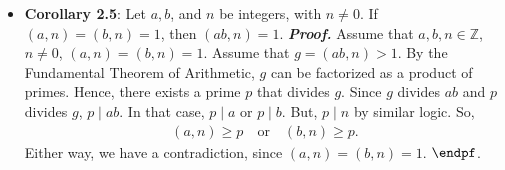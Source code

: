 \documentclass{report}
\begin{document}
\begin{itemize}
            \begin{align*}
                a = p_{1} \cdots p_{n} = q_{1} \cdots q_{m}
            \end{align*}
            for some primes $p_{i}$ and $q_{i}$. Without loss of generality, say $n \leq m$. Since
            \begin{align*}
                p_{1} \mid a
            ,\end{align*}
            $p_{1} \mid q_{i}$ for some $i$. We can rearrange the order to say that $p_{1} \mid q_{1}$. But, $q_{1}$ is prime, so $p_{1} = 1$ or $p_{1} = q_{1}$. Since $1$ is not prime, $p_{1} = q_{1}$. So, we can cancel $p_{1}$ from both sides to get
            \begin{align*}
                p_{2} \cdots p_{n} = q_{2} \cdots q_{m}
            .\end{align*}
            We can continue this process, finding that $p_{i} = q_{i} $ for $1 \leq i \leq n$. If $m=n$, we are done. Otherwise, we are left with $1 = q_{n+1} \cdots q_{m}$. But then $q_{m} \mid 1$, which is impossible since $q_{m} > 1$. $\endpf$
        \item \textbf{Corollary 2.5}: Let $a,b$, and $n$ be integers, with $n \ne 0$. If $(a,n) = (b,n) = 1$, then $(ab,n) = 1$.
            \bigbreak \noindent
            \textbf{\textit{Proof.}} Assume that $a,b,n \in \mathbb{Z}$, $n \ne 0$, $(a,n) = (b,n) = 1$.
            \bigbreak \noindent 
            Assume that $g = (ab,n) > 1$. By the Fundamental Theorem of Arithmetic, $g$ can be factorized as a product of primes. Hence, there exists a prime $p$ that divides $g$. Since $g$ divides $ab$ and $p$ divides $g$, $p \mid ab$. In that case, $p \mid a$ or $p\mid b$. But, $p \mid n$ by similar logic. So,
            \begin{align*}
                (a,n) \geq p \quad \text{or} \quad (b,n) \geq p
            .\end{align*}
            Either way, we have a contradiction, since $(a,n) = (b,n) =1$. $\endpf$.
    \end{itemize}

    \pagebreak 
\end{document}
